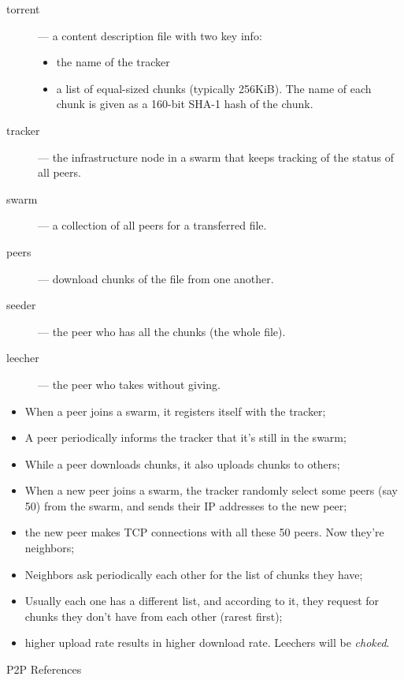 \begin{description}
\item[torrent] --- a content description file with two key info:
  \begin{itemize}
  \item the name of the tracker
  \item a list of equal-sized chunks (typically 256KiB). The name of each chunk is given
    as a 160-bit SHA-1 hash of the chunk.
  \end{itemize}
\item[tracker] --- the infrastructure node in a swarm that keeps tracking of the status of
  all peers.
\item[swarm] --- a collection of all peers for a transferred file.
\item[peers] --- download chunks of the file from one another.
\item[seeder] --- the peer who has all the chunks (the whole file).
\item[leecher] --- the peer who takes without giving.
\end{description}

\begin{itemize}
\item When a peer joins a swarm, it registers itself with the tracker;
\item A peer periodically informs the tracker that it's still in the swarm;
\item While a peer downloads chunks, it also uploads chunks to others;
\item When a new peer joins a swarm, the tracker randomly select some peers (say 50)
  from the swarm, and sends their IP addresses to the new peer;
\item the new peer makes TCP connections with all these 50 peers. Now they're neighbors;
\item Neighbors ask periodically each other for the list of chunks they have;
\item Usually each one has a different list, and according to it, they request for chunks they
  don't have from each other (rarest first);
\item higher upload rate results in higher download rate. Leechers will be \emph{choked}.
\end{itemize}

\begin{frame}{P2P References}
  \begin{refsection}
    \nocite{wiki:bt,cohen08specification}
    \printbibliography[heading=none]
  \end{refsection}
\end{frame}





